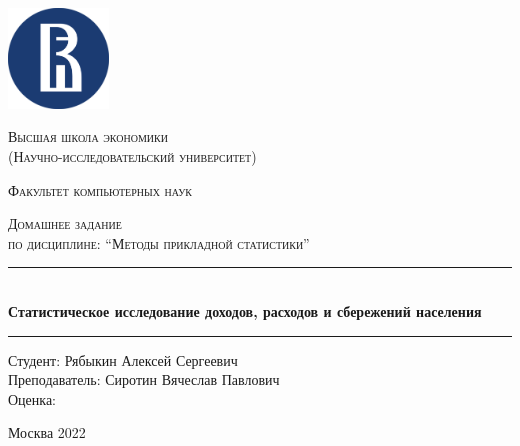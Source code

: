 \newcommand{\HRule}{\rule{\linewidth}{0.5mm}}

\begin{titlepage}

\centering
	\includegraphics[width=0.2\textwidth]{./title/logohse.png}\par\vspace{1cm}
	{\scshape \LARGE Высшая школа экономики \\ \small(Научно-исследовательский университет)\par}
	{\scshape \LARGE Факультет компьютерных наук\par}
	\vspace{3cm}
	{\scshape\Large Домашнее задание \\ \normalsize{по дисциплине: ``Методы прикладной статистики''}\par}
    \HRule \\[0.4cm]
    { \Large \bfseries Статистическое исследование доходов, расходов и сбережений населения}\\[0.4cm] %
    \HRule
	\vspace{5cm}
	\begin{flushright}
	Студент: Рябыкин Алексей Сергеевич \\
	Преподаватель: Сиротин Вячеслав Павлович
	\\
	Оценка: \underline{\hspace{0.2cm}}
    \end{flushright}
    \vfill

	{\large Москва 2022}
\end{titlepage}